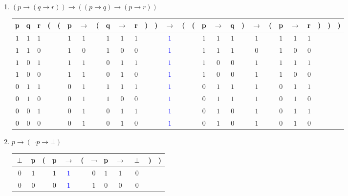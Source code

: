 \begin{problem}[7]
\begin{enumerate}
\item \textbf{$(p → (q → r)) → ((p → q) → (p → r))$}
\begin{center}
\begin{tabular}{|@{ }c@{ }@{ }c@{ }@{ }c | c@{}@{}c@{}@{ }c@{ }@{ }c@{ }@{}c@{}@{ }c@{ }@{ }c@{ }@{ }c@{ }@{}c@{}@{}c@{}@{ }c@{ }@{}c@{}@{}c@{}@{ }c@{ }@{ }c@{ }@{ }c@{ }@{}c@{}@{ }c@{ }@{}c@{}@{ }c@{ }@{ }c@{ }@{ }c@{ }@{}c@{}@{}c@{}@{}c@{ }|}\hline
p & q & r & ( & ( & p & $\rightarrow$ & ( & q & $\rightarrow$ & r & ) & ) & $\rightarrow$ & ( & ( & p & $\rightarrow$ & q & ) & $\rightarrow$ & ( & p & $\rightarrow$ & r & ) & ) & )\\
\hline
$1$ & $1$ & $1$ &  &  & $1$ & $1$ &  & $1$ & $1$ & $1$ &  &  & \textcolor{blue}{$1$} &  &  & $1$ & $1$ & $1$ &  & $1$ &  & $1$ & $1$ & $1$ &  &  & \\\hline
$1$ & $1$ & $0$ &  &  & $1$ & $0$ &  & $1$ & $0$ & $0$ &  &  & \textcolor{blue}{$1$} &  &  & $1$ & $1$ & $1$ &  & $0$ &  & $1$ & $0$ & $0$ &  &  & \\\hline
$1$ & $0$ & $1$ &  &  & $1$ & $1$ &  & $0$ & $1$ & $1$ &  &  & \textcolor{blue}{$1$} &  &  & $1$ & $0$ & $0$ &  & $1$ &  & $1$ & $1$ & $1$ &  &  & \\\hline
$1$ & $0$ & $0$ &  &  & $1$ & $1$ &  & $0$ & $1$ & $0$ &  &  & \textcolor{blue}{$1$} &  &  & $1$ & $0$ & $0$ &  & $1$ &  & $1$ & $0$ & $0$ &  &  & \\\hline
$0$ & $1$ & $1$ &  &  & $0$ & $1$ &  & $1$ & $1$ & $1$ &  &  & \textcolor{blue}{$1$} &  &  & $0$ & $1$ & $1$ &  & $1$ &  & $0$ & $1$ & $1$ &  &  & \\\hline
$0$ & $1$ & $0$ &  &  & $0$ & $1$ &  & $1$ & $0$ & $0$ &  &  & \textcolor{blue}{$1$} &  &  & $0$ & $1$ & $1$ &  & $1$ &  & $0$ & $1$ & $0$ &  &  & \\\hline
$0$ & $0$ & $1$ &  &  & $0$ & $1$ &  & $0$ & $1$ & $1$ &  &  & \textcolor{blue}{$1$} &  &  & $0$ & $1$ & $0$ &  & $1$ &  & $0$ & $1$ & $1$ &  &  & \\\hline
$0$ & $0$ & $0$ &  &  & $0$ & $1$ &  & $0$ & $1$ & $0$ &  &  & \textcolor{blue}{$1$} &  &  & $0$ & $1$ & $0$ &  & $1$ &  & $0$ & $1$ & $0$ &  &  & \\\hline
\end{tabular}
\end{center}
\item \textbf{$p → (¬p → ⊥)$}
\begin{center}


\begin{tabular}{|@{ }c@{ }@{ }c | c@{}@{ }c@{ }@{ }c@{ }@{}c@{}@{ }c@{ }@{ }c@{ }@{ }c@{ }@{ }c@{ }@{}c@{}@{}c@{ }|}\hline
$\perp$ & p & ( & p & $\rightarrow$ & ( & ¬ & p & $\rightarrow$ & $\perp$ & ) & )\\
\hline
$0$ & $1$ &  & $1$ & \textcolor{blue}{$1$} &  & $0$ & $1$ & $1$ & $0$ &  & \\\hline
$0$ & $0$ &  & $0$ & \textcolor{blue}{$1$} &  & $1$ & $0$ & $0$ & $0$ &  & \\\hline
\end{tabular}


\end{center}
\end{enumerate}
\end{problem}
